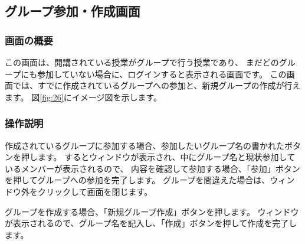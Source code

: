 
\newpage

\subsection{グループ参加・作成画面}
\subsubsection{画面の概要}
この画面は、開講されている授業がグループで行う授業であり、
まだどのグループにも参加していない場合に、ログインすると表示される画面です。
この画面では、すでに作成されているグループへの参加と、新規グループの作成が行えます。
図\ref{fig:26}にイメージ図を示します。

\subsubsection{操作説明}

作成されているグループに参加する場合、参加したいグループ名の書かれたボタンを押します。
するとウィンドウが表示され、中にグループ名と現状参加しているメンバーが表示されるので、
内容を確認して参加する場合、「参加」ボタンを押してグループへの参加を完了します。
グループを間違えた場合は、ウィンドウ外をクリックして画面を閉じます。

グループを作成する場合、「新規グループ作成」ボタンを押します。
ウィンドウが表示されるので、グループ名を記入し、「作成」ボタンを押して作成を完了します。


